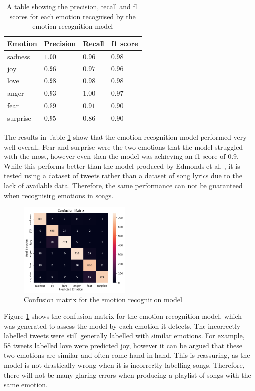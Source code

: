 \documentclass[11pt]{article}
\begin{document}
\begin{table}[h]
    \centering
    \caption{A table showing the precision, recall and f1 scores for each emotion recognised by the emotion recognition model}
    \begin{tabularx}{0.48\textwidth}{| X | X X X |} 
      \hline
      Emotion & Precision & Recall & f1 score\\ \hline
      sadness & $1.00$ & $0.96$ & $0.98$ \\ \hline
      joy & $0.96$ & $0.97$ & $0.96$ \\ \hline
      love & $0.98$ & $0.98$ & $0.98$ \\ \hline
      anger & $0.93$ & $1.00$ & $0.97$ \\ \hline
      fear & $0.89$ & $0.91$ & $0.90$ \\ \hline
      surprise & $0.95$ & $0.86$ & $0.90$ \\ \hline
    \end{tabularx}
    \label{tbl:f1}
\end{table}

The results in Table \ref{tbl:f1} show that the emotion recognition model performed very well overall. Fear and surprise were the two emotions that the model struggled with the most, however even then the model was achieving an f1 score of 0.9. While this performs better than the model produced by Edmonds et al. \cite{edmonds-sedoc-2021-multi}, it is tested using a dataset of tweets rather than a dataset of song lyrics due to the lack of available data. Therefore, the same performance can not be guaranteed when recognising emotions in songs.


\begin{figure}[H]
    \centering
    \includegraphics[width=0.48\textwidth]{images/Confusion.png}
    \caption{Confusion matrix for the emotion recognition model}
    \label{fig:confusion}
\end{figure}

Figure \ref{fig:confusion} shows the confusion matrix for the emotion recognition model, which was generated to assess the model by each emotion it detects. The incorrectly labelled tweets were still generally labelled with similar emotions. For example, 58 tweets labelled love were predicted joy, however it can be argued that these two emotions are similar and often come hand in hand. This is reassuring, as the model is not drastically wrong when it is incorrectly labelling songs. Therefore, there will not be many glaring errors when producing a playlist of songs with the same emotion. 
\end{document}
